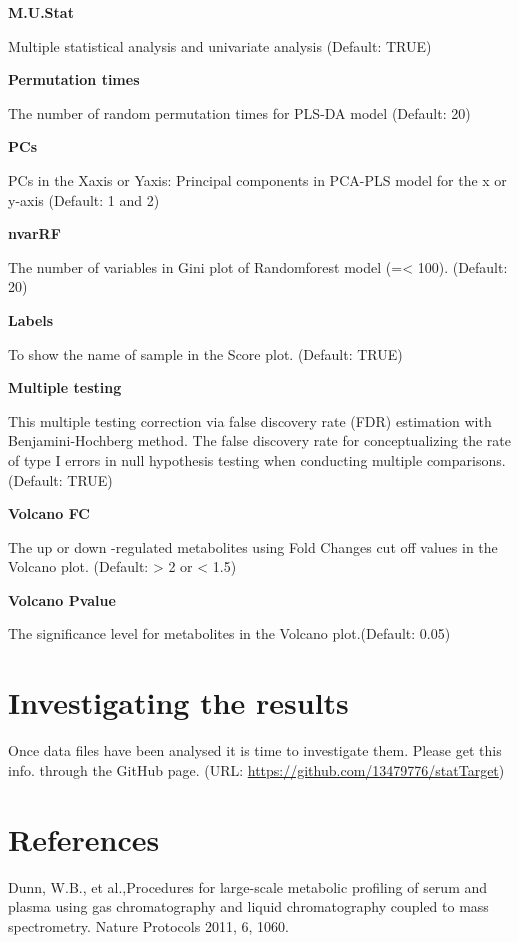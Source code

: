 \documentclass[english]{article}
\begin{document}
\textbf{M.U.Stat}


Multiple statistical analysis and univariate analysis (Default: TRUE) 


\textbf{Permutation times}


The number of random permutation times for PLS-DA model (Default: 20) 



\textbf{PCs}


PCs in the Xaxis or Yaxis: Principal components in 
PCA-PLS model for the x or y-axis (Default: 1 and 2) 


\textbf{nvarRF}


The number of variables in Gini plot of Randomforest model (=< 100).
(Default: 20) 


\textbf{Labels}


To show the name of sample in the Score plot. (Default: TRUE) 


\textbf{Multiple testing}


This multiple testing correction via false discovery rate (FDR) 
estimation with Benjamini-Hochberg method. The false discovery rate 
for conceptualizing the rate of type I errors in null hypothesis 
testing when conducting multiple comparisons. (Default: TRUE) 



\textbf{Volcano FC}


The up or down -regulated metabolites using Fold Changes cut off 
values in the Volcano plot. (Default:  > 2 or < 1.5) 


\textbf{Volcano Pvalue}


The significance level for metabolites in the Volcano plot.(Default: 0.05) 



\section[Investigating the results]{
Investigating the results}

Once data  files have been analysed it is time to investigate them. 
Please get this info. through the GitHub page.
(URL: \url{https://github.com/13479776/statTarget})


 
 
\section[References]{References}

\noindent Dunn, W.B., et al.,Procedures for large-scale metabolic profiling of
serum and plasma using gas chromatography and liquid chromatography coupled 
to mass spectrometry. Nature Protocols 2011, 6, 1060.
\end{document}
